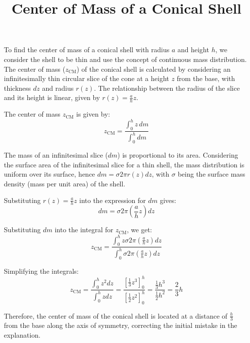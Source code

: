 \documentclass{article}
\begin{document}
\title{Center of Mass of a Conical Shell}
\date{}
\maketitle

To find the center of mass of a conical shell with radius $a$ and height $h$, we consider the shell to be thin and use the concept of continuous mass distribution. The center of mass ($z_{\text{CM}}$) of the conical shell is calculated by considering an infinitesimally thin circular slice of the cone at a height $z$ from the base, with thickness $dz$ and radius $r(z)$. The relationship between the radius of the slice and its height is linear, given by $r(z) = \frac{a}{h}z$.

The center of mass $z_{\text{CM}}$ is given by:
\[ z_{\text{CM}} = \frac{\int_0^h z \, dm}{\int_0^h dm} \]

The mass of an infinitesimal slice ($dm$) is proportional to its area. Considering the surface area of the infinitesimal slice for a thin shell, the mass distribution is uniform over its surface, hence $dm = \sigma 2\pi r(z) dz$, with $\sigma$ being the surface mass density (mass per unit area) of the shell.

Substituting $r(z) = \frac{a}{h}z$ into the expression for $dm$ gives:
\[ dm = \sigma 2\pi \left(\frac{a}{h}z\right) dz \]

Substituting $dm$ into the integral for $z_{\text{CM}}$, we get:
\[ z_{\text{CM}} = \frac{\int_0^h z \sigma 2\pi \left(\frac{a}{h}z\right) dz}{\int_0^h \sigma 2\pi \left(\frac{a}{h}z\right) dz} \]

Simplifying the integrals:
\[ z_{\text{CM}} = \frac{\int_0^h z^2 dz}{\int_0^h z dz} = \frac{\left[\frac{1}{3}z^3\right]_0^h}{\left[\frac{1}{2}z^2\right]_0^h} = \frac{\frac{1}{3}h^3}{\frac{1}{2}h^2} = \frac{2}{3}h \]

Therefore, the center of mass of the conical shell is located at a distance of $\frac{h}{3}$ from the base along the axis of symmetry, correcting the initial mistake in the explanation.
\end{document}
